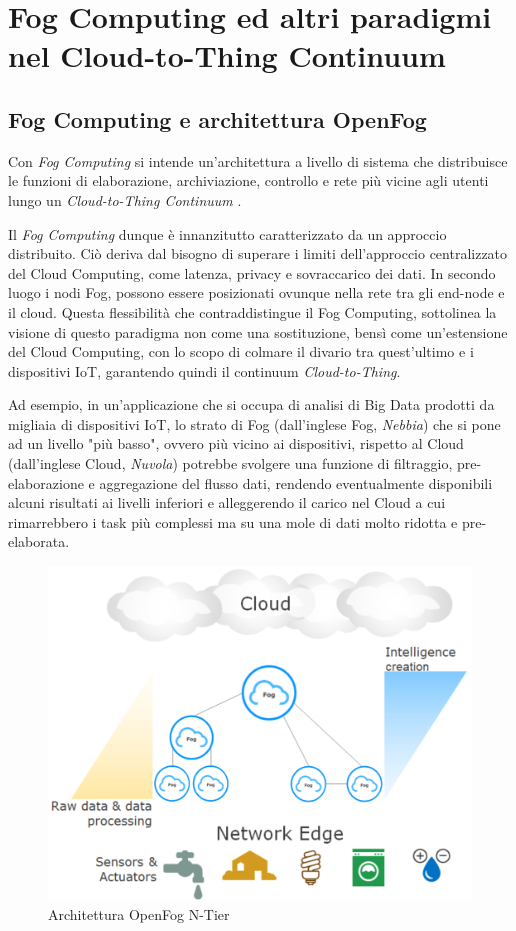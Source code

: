 \section{Fog Computing ed altri paradigmi nel Cloud-to-Thing Continuum}

\subsection{Fog Computing e architettura OpenFog}

Con \textit{Fog Computing} si intende un'architettura a livello di sistema che distribuisce le funzioni di elaborazione, archiviazione, controllo e rete più vicine agli utenti lungo un \textit{Cloud-to-Thing Continuum} \cite{OpenFogReferenceArchitecture}.

Il \textit{Fog Computing} dunque è innanzitutto caratterizzato da un approccio distribuito. Ciò deriva dal bisogno di superare i limiti dell'approccio centralizzato del Cloud Computing, come latenza, privacy e sovraccarico dei dati. In secondo luogo i nodi Fog, possono essere posizionati ovunque nella rete tra gli end-node e il cloud. Questa flessibilità che contraddistingue il Fog Computing, sottolinea la visione di questo paradigma non come una sostituzione, bensì come un'estensione del Cloud Computing, con lo scopo di colmare il divario tra quest'ultimo e i dispositivi IoT, garantendo quindi il continuum \textit{Cloud-to-Thing}.

Ad esempio, in un'applicazione che si occupa di analisi di Big Data prodotti da migliaia di dispositivi IoT, lo strato di Fog (dall'inglese Fog, \textit{Nebbia}) che si pone ad un livello "più basso", ovvero più vicino ai dispositivi, rispetto al Cloud (dall'inglese Cloud, \textit{Nuvola}) potrebbe svolgere una funzione di filtraggio, pre-elaborazione e aggregazione del flusso dati, rendendo eventualmente disponibili alcuni risultati ai livelli inferiori e alleggerendo il carico nel Cloud a cui rimarrebbero i task più complessi ma su una mole di dati molto ridotta e pre-elaborata.

\begin{figure}[!ht]
  \includegraphics[width=12cm]{images/FogCloudToThingContinuum}
  \centering
  \caption[Architettura OpenFog N-Tier]{Architettura OpenFog N-Tier \cite{OpenFogReferenceArchitecture}}
  \label{fig:ntier_architecture}
\end{figure}

